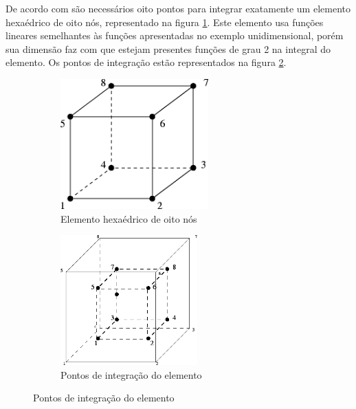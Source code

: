 De acordo com \cite{Paulo} são necessários oito pontos para integrar exatamente um elemento hexaédrico de oito nós, representado na figura \ref{fig:hexaoito}. Este elemento usa funções lineares semelhantes às funções apresentadas no exemplo unidimensional, porém sua dimensão faz com que estejam presentes funções de grau 2 na integral do elemento. Os pontos de integração estão representados na figura  \ref{fig:hexapontos}. \\
\begin{figure}
\caption{Elemento hexaédrico de oito nós e seus pontos de integração.}

\begin{subfigure}{0.5\textwidth}
\includegraphics[width=0.9\linewidth, height=5cm]{images/hexapointsofint.png}
    \caption{Elemento hexaédrico de oito nós}
    \label{fig:hexaoito}
\end{subfigure}
\begin{subfigure}{0.5\textwidth}
\includegraphics[width=0.9\linewidth, height=5cm]{images/hexaelement.png}
\caption{Pontos de integração do elemento}
\label{fig:hexapontos}
\end{subfigure}
\label{fig:hexaele}

\end{figure}

